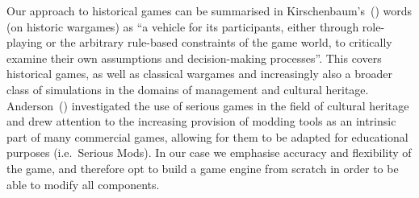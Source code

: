\documentclass[11pt]{article}
\begin{document}

Our approach to historical games can be summarised
in Kirschenbaum's~(\cite*{Kirschenbaum}) words (on historic wargames) as ``a vehicle for its participants,
either through role-playing or the arbitrary rule-based constraints of
the game world, to critically examine their own assumptions and
decision-making processes''. 
This covers historical games, as well as classical wargames and increasingly
also a broader class of simulations in the domains of management and cultural heritage. 
Anderson~(\cite*{Anderson}) investigated the use of serious games
in the field of cultural heritage and drew attention to the increasing
provision of modding tools as an intrinsic part of many commercial
games, allowing for them to be adapted for educational purposes (i.e.\ Serious Mods). 
In our case we emphasise accuracy and flexibility of the game, and therefore
opt to build a game engine from scratch in order to be able to modify all components.
\end{document}
